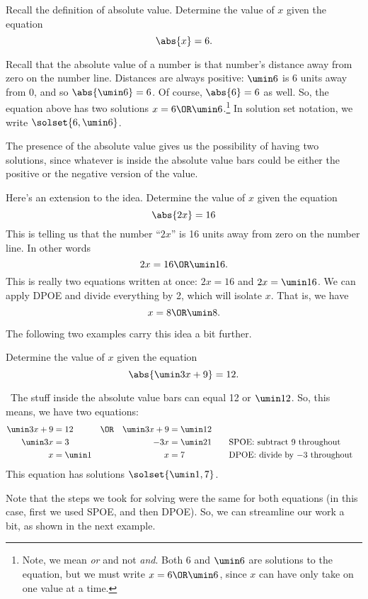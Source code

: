 \begin{boxedexplore}
Recall the definition of absolute value. Determine the value of $x$ given the equation \[\abs{x} = 6.\]
\end{boxedexplore} %

Recall that the absolute value of a number is that number's distance away from zero on the number line. Distances are always positive: $\umin6$ is 6 units away from 0, and so $\abs{\umin6}=6$. Of course, $\abs{6} = 6$ as well. So, the equation above has two solutions $x = 6 \OR \umin6$.\footnote{Note, we mean \textit{or} and not \textit{and}. Both 6 and $\umin6$ are solutions to the equation, but we must write $x=6 \OR \umin6$, since $x$ can have only take on one value at a time.} In solution set notation, we write $\solset{6, \umin6}$.

The presence of the absolute value gives us the possibility of having two solutions, since whatever is inside the absolute value bars could be either the positive or the negative version of the value.

Here's an extension to the idea. Determine the value of $x$ given the equation \[\abs{2x} = 16\]
This is telling us that the number ``$2x$'' is 16 units away from zero on the number line. In other words \[2x = 16 \OR \umin16.\]
This is really two equations written at once: $2x = 16$ and $2x = \umin16$. We can apply DPOE and divide everything by 2, which will isolate $x$. That is, we have \[x = 8 \OR \umin8.\]

The following two examples carry this idea a bit further.

\begin{boxedex}
Determine the value of $x$ given the equation \[\abs{\umin3x+9} = 12.\]

\exsoln\ The stuff inside the absolute value bars can equal 12 or $\umin12$. So, this means, we have two equations:
\[\begin{aligned}
\umin3x + 9 &= 12 	&\OR 	&&\umin3x + 9 &= \umin12\\
\umin3x  &= 3 		&	 	&&-3x &= \umin21
&&\text{\quad SPOE: subtract 9 throughout}\\
x &= \umin1 		&	 	&&x &= 7
&&\text{\quad DPOE: divide by $-3$ throughout}\\
\end{aligned}\]
This equation has solutions $\solset{\umin1, 7}$.
\end{boxedex}

Note that the steps we took for solving were the same for both equations (in this case, first we used SPOE, and then DPOE). So, we can streamline our work a bit, as shown in the next example.

